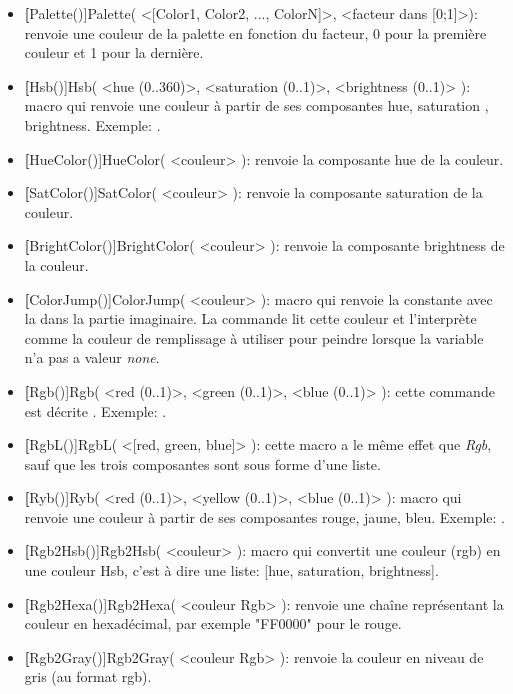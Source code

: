 \begin{itemize}
macro qui renvoie la couleur  (rgb) obtenue après le mélange des différentes couleurs passées en arguments en suivants
les proportions correspondantes.
\item \textbf[Palette()]{Palette( <[Color1, Color2, ..., ColorN]>, <facteur dans [0;1]>)}: renvoie une
couleur de la palette en fonction du facteur, 0 pour la première couleur et 1 pour la dernière.
\item \textbf[Hsb()]{Hsb( <hue (0..360)>, <saturation (0..1)>, <brightness (0..1)> )}: macro qui renvoie une couleur à
partir de ses composantes hue, saturation , brightness. Exemple: .
\item \textbf[HueColor()]{HueColor( <couleur> )}: renvoie la composante hue de la couleur.
\item \textbf[SatColor()]{SatColor( <couleur> )}: renvoie la composante saturation de la couleur.
\item \textbf[BrightColor()]{BrightColor( <couleur> )}: renvoie la composante brightness de la couleur.

\item \textbf[ColorJump()]{ColorJump( <couleur> )}: macro qui renvoie la constante \jump avec la  dans la
partie imaginaire. La commande  lit cette couleur et l'interprète comme la couleur de
remplissage à utiliser pour peindre lorsque la variable  n'a pas a valeur \textit{none}.

\item \textbf[Rgb()]{Rgb( <red (0..1)>, <green (0..1)>, <blue (0..1)> )}: cette commande est décrite
. Exemple: .

\item  \textbf[RgbL()]{RgbL( <[red, green, blue]> )}: cette macro a le même effet que \textit{Rgb}, sauf que les trois
composantes sont sous forme d'une liste.

\item \textbf[Ryb()]{Ryb( <red (0..1)>, <yellow (0..1)>, <blue (0..1)> )}: macro qui renvoie une couleur à partir de
ses composantes rouge, jaune, bleu. Exemple: .

\item \textbf[Rgb2Hsb()]{Rgb2Hsb( <couleur> )}: macro qui convertit une couleur (rgb) en une couleur Hsb, c'est à dire
une liste: [hue, saturation, brightness].

\item \textbf[Rgb2Hexa()]{Rgb2Hexa( <couleur Rgb> )}: renvoie une chaîne représentant la couleur en hexadécimal, par
exemple "FF0000" pour le rouge.

\item \textbf[Rgb2Gray()]{Rgb2Gray( <couleur Rgb> )}: renvoie la couleur en niveau de gris (au format rgb).
\end{itemize}

